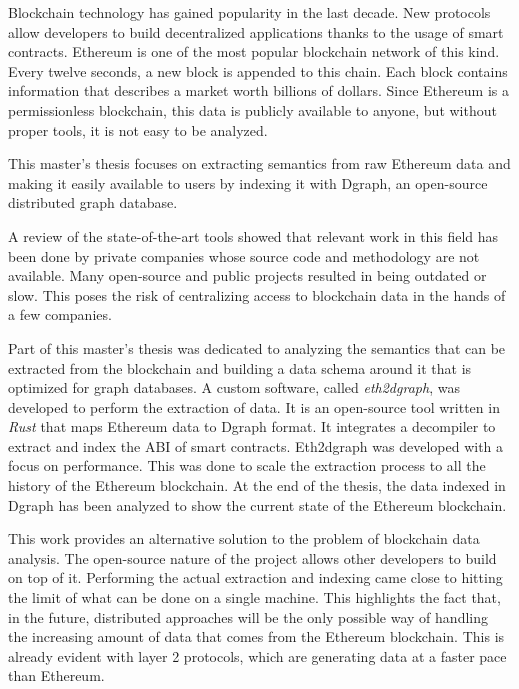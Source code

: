 Blockchain technology has gained popularity in the last decade. New protocols allow developers to build decentralized applications thanks to the usage of smart contracts. Ethereum is one of the most popular blockchain network of this kind. Every twelve seconds, a new block is appended to this chain. Each block contains information that describes a market worth billions of dollars. Since Ethereum is a permissionless blockchain, this data is publicly available to anyone, but without proper tools, it is not easy to be analyzed.

This master's thesis focuses on extracting semantics from raw Ethereum data and making it easily available to users by indexing it with Dgraph, an open-source distributed graph database. 

A review of the state-of-the-art tools showed that relevant work in this field has been done by private companies whose source code and methodology are not available. Many open-source and public projects resulted in being outdated or slow. This poses the risk of centralizing access to blockchain data in the hands of a few companies.

Part of this master's thesis was dedicated to analyzing the semantics that can be extracted from the blockchain and building a data schema around it that is optimized for graph databases. A custom software, called \textit{eth2dgraph}, was developed to perform the extraction of data. It is an open-source tool written in \textit{Rust} that maps Ethereum data to Dgraph format. It integrates a decompiler to extract and index the ABI of smart contracts. Eth2dgraph was developed with a focus on performance. This was done to scale the extraction process to all the history of the Ethereum blockchain. At the end of the thesis, the data indexed in Dgraph has been analyzed to show the current state of the Ethereum blockchain.

This work provides an alternative solution to the problem of blockchain data analysis. The open-source nature of the project allows other developers to build on top of it. Performing the actual extraction and indexing came close to hitting the limit of what can be done on a single machine. This highlights the fact that, in the future, distributed approaches will be the only possible way of handling the increasing amount of data that comes from the Ethereum blockchain. This is already evident with layer 2 protocols, which are generating data at a faster pace than Ethereum.

